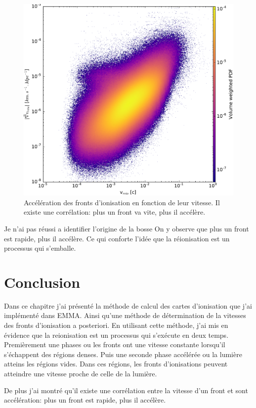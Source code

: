 \begin{figure}[htpb]
        \includegraphics[width=.95\linewidth]{img/04_mapreio/v_gradv_c1.pdf} 
        \caption{Accélération des fronts d'ionisation en fonction de leur vitesse.
        Il existe une corrélation: plus un front va vite, plus il accélère.
        }
 		\label{fig:accspeed}
\end{figure}


Je n'ai pas réussi a identifier l'origine de la bosse
On y observe que plus un front est rapide, plus il accélère.
Ce qui conforte l'idée que la réionisation est un processus qui s'emballe.


\section{Conclusion}
Dans ce chapitre j'ai présenté la méthode de calcul des cartes d'ionisation que j'ai implémenté dans EMMA.
Ainsi qu'une méthode de détermination de la vitesses des fronts d'ionisation a posteriori.
En utilisant cette méthode, j'ai mis en évidence que la reionisation est un processus qui s’exécute en deux temps.
Premièrement une phases ou les fronts ont une vitesse constante lorsqu'il s'échappent des régions denses.
Puis une seconde phase accélérée ou la lumière atteins les régions vides.
Dans ces régions, les fronts d'ionisations peuvent atteindre une vitesse proche de celle de la lumière.

De plus j'ai montré qu'il existe une corrélation entre la vitesse d'un front et sont accélération: plus un front est rapide, plus il accélère.





